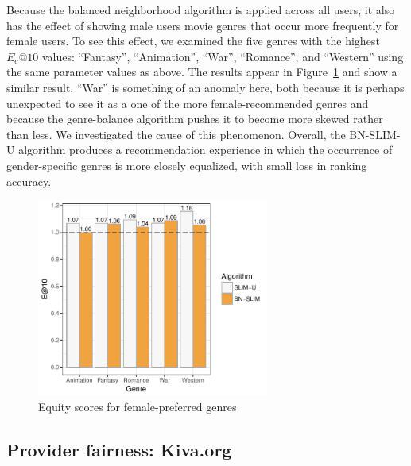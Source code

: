 Because the balanced neighborhood algorithm is applied across all users, it also has the effect of showing male users movie genres that occur more frequently for female users. To see this effect, we examined the five genres with the highest $E_c@10$ values: ``Fantasy'', ``Animation'', ``War'', ``Romance'', and ``Western'' using the same parameter values as above. The results appear in Figure~\ref{fig:inverse-equity} and show a similar result. ``War'' is something of an anomaly here, both because it is perhaps unexpected to see it as a one of the more female-recommended genres and because the genre-balance algorithm pushes it to become more skewed rather than less. We investigated the cause of this phenomenon. Overall, the BN-SLIM-U algorithm produces a recommendation experience in which the occurrence of gender-specific genres is more closely equalized, with small loss in ranking accuracy. 

\begin{figure}[bth]
    \centering
    \includegraphics[width=3in]{imgs/bln/inverse-genres3.pdf}
    \caption{Equity scores for female-preferred genres}
    \label{fig:inverse-equity}
\end{figure}

\subsection{Provider fairness: Kiva.org}


